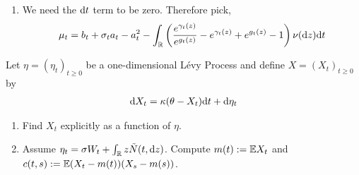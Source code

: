 \begin{solution}[Solution]
\begin{enumerate}[label=(\alph*)]
    \item 
        We need the \( \mathrm{d} t \) term to be zero. Therefore pick,
        \begin{align*}
            \mu_t = b_t + \sigma_t a_t - a_t^2
            -\int_{\mathbb{R}} \left( \dfrac{e^{\gamma_t(z)}}{e^{g_t(z)}} - e^{\gamma_t(z)}+e^{g_t(z)}-1 \right) \nu(\mathrm{d} z)\mathrm{d} t
        \end{align*}
\end{enumerate}
\end{solution}

\begin{problem}[Exercise 10.4]
    Let \( \eta = (\eta_t)_{t\geq 0} \) be a one-dimensional L\'evy Process and define \( X = (X_t)_{t\geq 0} \) by
    \begin{align*}
        \mathrm{d} X_t = \kappa(\theta - X_t)\mathrm{d} t + \mathrm{d} \eta_t
    \end{align*}
    
    \begin{enumerate}[label=(\alph*)]
        \item Find \( X_t \) explicitly as a function of \( \eta \).
        \item Assume \( \eta_t = \sigma  W_t + \int_{\mathbb{R}} z \tilde{N}(t,\mathrm{d} z) \). Compute \( m(t):= \mathbb{E} X_t \) and \( c(t,s):= \mathbb{E}(X_t-m(t))(X_s-m(s)) \).
    \end{enumerate}
\end{problem}

